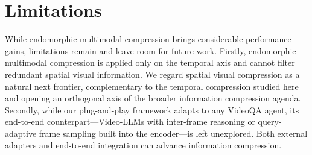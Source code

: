 \section*{Limitations}

While endomorphic multimodal compression brings considerable performance gains, limitations remain and leave room for future work.
Firstly, endomorphic multimodal compression is applied only on the temporal axis and cannot filter redundant spatial visual information. We regard spatial visual compression as a natural next frontier, complementary to the temporal compression studied here and opening an orthogonal axis of the broader information compression agenda.
Secondly, while our plug-and-play framework adapts to any VideoQA agent, its end-to-end counterpart---Video-LLMs with inter-frame reasoning or query-adaptive frame sampling built into the encoder---is left unexplored. Both external adapters and end-to-end integration can advance information compression.
